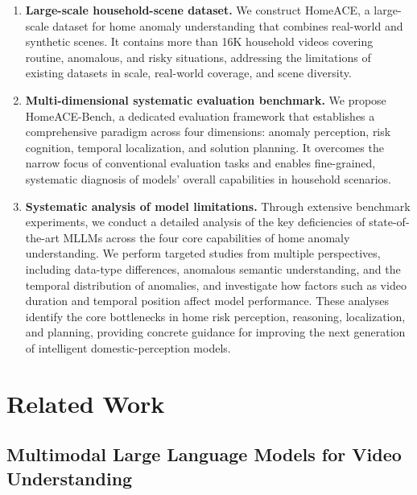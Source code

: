 \documentclass{article} %
\begin{document}
\begin{enumerate}
    \item \textbf{Large-scale household-scene dataset.} We construct HomeACE, a large-scale dataset for home anomaly understanding that combines real-world and synthetic scenes. It contains more than 16K household videos covering routine, anomalous, and risky situations, addressing the limitations of existing datasets in scale, real-world coverage, and scene diversity.
    \item \textbf{Multi-dimensional systematic evaluation benchmark.} We propose HomeACE-Bench, a dedicated evaluation framework that establishes a comprehensive paradigm across four dimensions: anomaly perception, risk cognition, temporal localization, and solution planning. It overcomes the narrow focus of conventional evaluation tasks and enables fine-grained, systematic diagnosis of models' overall capabilities in household scenarios.
    \item \textbf{Systematic analysis of model limitations.} Through extensive benchmark experiments, we conduct a detailed analysis of the key deficiencies of state-of-the-art MLLMs across the four core capabilities of home anomaly understanding. We perform targeted studies from multiple perspectives, including data-type differences, anomalous semantic understanding, and the temporal distribution of anomalies, and investigate how factors such as video duration and temporal position affect model performance. These analyses identify the core bottlenecks in home risk perception, reasoning, localization, and planning, providing concrete guidance for improving the next generation of intelligent domestic-perception models.
\end{enumerate}


\section{Related Work}
\subsection{Multimodal Large Language Models for Video Understanding}
\end{document}
